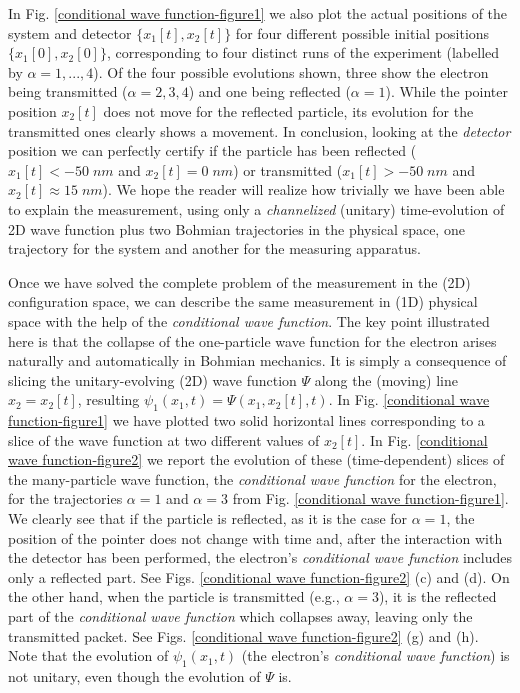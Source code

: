 \documentclass[nofootinbib, secnumarabic, amsmath, nobibnotes,10pt,aps,pra]{revtex4-1}
\newcommand{\fref}[1]{Fig. \ref{#1}}
\begin{document}
In \fref{conditional wave function-figure1} we also plot the actual positions of the system and detector $\{x_1[t],x_2[t]\}$ for four different possible initial positions $\{x_1[0], x_2[0]\}$, corresponding to four distinct runs of the experiment (labelled by $\alpha=1,...,4$). Of the four possible evolutions shown, three show the electron being transmitted ($\alpha=2,3,4$) and one being reflected ($\alpha=1$). While the pointer position $x_2[t]$ does not move for the reflected particle, its evolution for the transmitted ones clearly shows a movement. In conclusion, looking at the \emph{detector} position we can perfectly certify if the particle has been reflected ($x_1[t]< -50\;nm$ and $x_2[t]=0\;nm $) or transmitted ($x_1[t]> -50\;nm$ and $x_2[t] \approx 15\;nm $). We hope the reader will realize how trivially we have been
able to explain the measurement, using only a \emph{channelized} (unitary) time-evolution of 2D wave function plus two Bohmian trajectories in the physical space, one trajectory for the system and another for the measuring apparatus. 

Once we have solved the complete problem of the measurement in the (2D) configuration space, we can describe the same measurement in (1D) physical space with the help of the \emph{conditional wave function}. The key point illustrated here is that the collapse of the one-particle wave function for the electron arises naturally and automatically in Bohmian mechanics.  It is simply a consequence of slicing the unitary-evolving (2D) wave function $\Psi$ along the (moving) line $x_2 = x_2[t]$, resulting $\psi_1(x_1,t)=\Psi(x_1,x_2[t],t)$. In \fref{conditional wave function-figure1} we have plotted two solid horizontal lines corresponding to a slice of the wave function at two different values of $x_2[t]$. In \fref{conditional wave function-figure2} we report the evolution of these (time-dependent) slices of the many-particle wave function, the \emph{conditional wave function} for the electron, for the trajectories $\alpha = 1$ and $\alpha = 3$ from \fref{conditional wave function-figure1}. We clearly see that if the particle is reflected, as it is the case for $\alpha = 1$, the position of the pointer does not change with time and, after the interaction with the detector has been performed, the electron's \emph{conditional wave function} includes only a reflected part. See Figs. \ref{conditional wave function-figure2} (c) and (d). On the other hand, when the particle is transmitted (e.g., $\alpha =3$), it is the reflected part of the \emph{conditional wave function} which collapses away, leaving only the transmitted packet.  See Figs. \ref{conditional wave  function-figure2} (g) and (h). Note that the evolution of $\psi_1(x_1,t)$ (the electron's \emph{conditional wave function}) is not unitary, even though the evolution of $\Psi$ is. 
\end{document}

